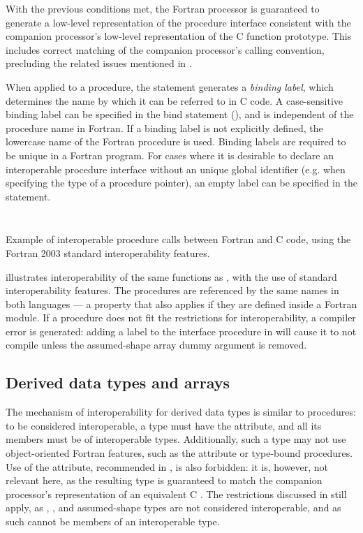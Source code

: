 With the previous conditions met, the Fortran processor is guaranteed to generate a low-level representation of the procedure interface consistent with the companion processor's low-level representation of the C function prototype. This includes correct matching of the companion processor's calling convention, precluding the related issues mentioned in .

When applied to a procedure, the  statement generates a \textit{binding label}, which determines the name by which it can be referred to in C code. A case-sensitive binding label can be specified in the bind statement (), and is independent of the procedure name in Fortran. If a binding label is not explicitly defined, the lowercase name of the Fortran procedure is used. Binding labels are required to be unique in a Fortran program. For cases where it is desirable to declare an interoperable procedure interface without an unique global identifier (e.g. when specifying the type of a procedure pointer), an empty label can be specified in the  statement.

\begin{listing}
	\inputminted{C}{src/f03/calls/csrc.c}
	\inputminted{Fortran}{src/f03/calls/fsrc.f90}
	\caption{Example of interoperable procedure calls between Fortran and C code, using the Fortran 2003 standard interoperability features.}
	\label{src:f03_calls}
\end{listing}

 illustrates interoperability of the same functions as , with the use of standard interoperability features. The  procedures are referenced by the same names in both languages --- a property that also applies if they are defined inside a Fortran module. If a  procedure does not fit the restrictions for interoperability, a compiler error is generated: adding a  label to the interface procedure in  will cause it to not compile unless the assumed-shape array dummy argument is removed.

\subsection{Derived data types and arrays} \label{sec:interop_f03_derived}

The mechanism of interoperability for derived data types is similar to procedures: to be considered interoperable, a type must have the  attribute, and all its members must be of interoperable types. Additionally, such a type may not use object-oriented Fortran features, such as the  attribute or type-bound procedures. Use of the  attribute, recommended in , is also forbidden: it is, however, not relevant here, as the resulting type is guaranteed to match the companion processor's representation of an equivalent C . The restrictions discussed in  still apply, as , , and assumed-shape types are not considered interoperable, and as such cannot be members of an interoperable type.

